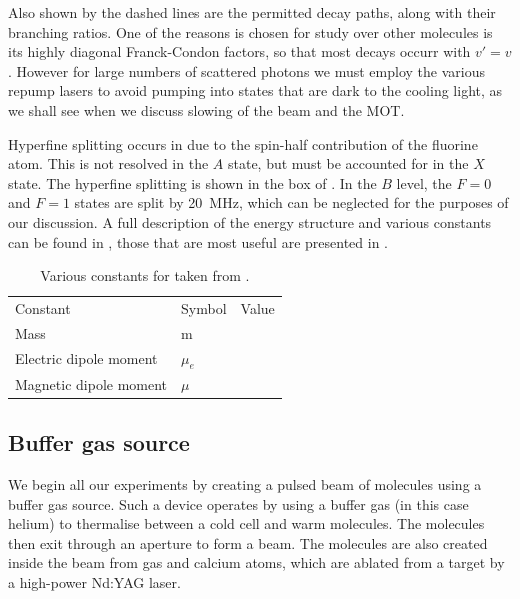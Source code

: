 Also shown by the dashed lines are the permitted decay paths, along with their
branching ratios. One of the reasons \CaF{} is chosen for study over other
molecules is its highly diagonal Franck-Condon factors, so that most decays
occurr with $v'=v$. However for large numbers of scattered photons we must
employ the various repump lasers to avoid pumping into states that are dark to
the cooling light, as we shall see when we discuss slowing of the beam and the
MOT.

Hyperfine splitting occurs in \CaF{} due to the spin-half contribution of the
fluorine atom. This is not resolved in the $A$ state, but must be accounted for
in the $X$ state. The hyperfine splitting is shown in the box of
. In the $B$ level, the $F=0$ and $F=1$ states
are split by \SI{20}{\mega\hertz}, which can be neglected for the purposes of
our discussion. A full description of the \CaF{} energy structure and various
constants can be found in , those that are most useful
are presented in .

\begin{table}
  \centering
\begin{tabular}{lll}
  Constant & Symbol & Value \\
  Mass & m & \\
  Electric dipole moment & $\mu_e$ & \\
  Magnetic dipole moment & $\mu$ & \\
 \hline
\end{tabular}
\caption{
  Various constants for \CaF{} taken from .
  }
  \label{overview:table:lasers}
\end{table}

\subsection*{Buffer gas source}

We begin all our experiments by creating a pulsed beam of \CaF{} molecules
using a buffer gas source. Such a device operates by using a buffer gas (in
this case helium) to thermalise between a cold cell and warm molecules. The
molecules then exit through an aperture to form a beam. The \CaF{} molecules are also
created inside the beam from \SFsix{} gas and calcium atoms, which are ablated
from a target by a high-power Nd:YAG laser.

